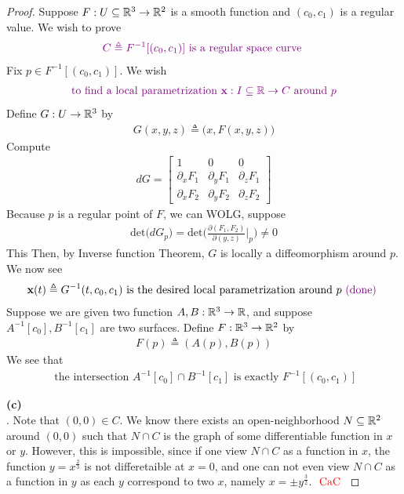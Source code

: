 \documentclass{report}
\begin{document}
\begin{proof}
Suppose $F:U\subseteq \mathbb{R}^3\rightarrow \mathbb{R}^2$ is a smooth function and $(c_0,c_1)$ is a regular value. We wish to prove 
\begin{align*}
\textcolor{violet}{C\triangleq F^{-1}[(c_0,c_1)]\text{ is a regular space curve }}
\end{align*}
Fix $p\in  F^{-1}[(c_0,c_1)]$. We wish 
\begin{align*}
\textcolor{violet}{\text{ to find a local parametrization $\textbf{x}:I\subseteq \mathbb{R}\rightarrow C$  around $p$ }}
\end{align*}
Define $G:U\rightarrow \mathbb{R}^3$ by
\begin{align*}
G(x,y,z)\triangleq \Big(x,F(x,y,z) \Big)
\end{align*}
Compute 
\begin{align*}
dG=\begin{bmatrix}
  1 & 0 & 0 \\
  \partial_x F_1 & \partial_y F_1 & \partial_z F_1\\
  \partial_x F_2 & \partial_y F_2 & \partial_z F_2
\end{bmatrix}
\end{align*}
Because $p$ is a regular point of $F$, we can WOLG, suppose 
\begin{align*}
\text{det}\big( dG_p\big)=\text{det}\Big( \frac{\partial (F_1,F_2)}{\partial (y,z)}\Big|_p\Big)\neq 0
\end{align*}
This Then, by Inverse function Theorem, $G$ is locally a diffeomorphism around $p$. We now see 
\begin{align*}
\textbf{x}(t)\triangleq G^{-1}(t,c_0,c_1)\text{ is the desired local parametrization around $p\textcolor{violet}{\text{ (done) }}$}
\end{align*}
Suppose we are given two function $A,B:\mathbb{R}^3\rightarrow \mathbb{R}$, and suppose  $A^{-1}[c_0],B^{-1}[c_1]$ are two surfaces. Define $F:\mathbb{R}^3\rightarrow \mathbb{R}^2$ by  
\begin{align*}
F(p)\triangleq (A(p),B(p))
\end{align*}
We see that 
\begin{align*}
\text{ the intersection }A^{-1}[c_0]\cap B^{-1}[c_1]\text{ is exactly }F^{-1}[(c_0,c_1)]
\end{align*}

\textbf{(c)}\\

. Note that $(0,0)\in C$. We know there exists an open-neighborhood $N\subseteq \mathbb{R}^2$ around $(0,0)$ such that $N\cap C$ is the graph of some differentiable function in $x$ or  $y$. However, this is impossible, since if one view $N\cap C$ as a function in $x$, the function  $y=x^{\frac{2}{3}}$ is not differetaible at $x=0$, and one can not even view $N\cap C$ as a function in $y$ as each  $y$ correspond to two $x$, namely  $x=\pm y^{\frac{3}{2}}$. $\text{ \textcolor{red}{CaC} }$ 

\end{proof}
\end{document}

